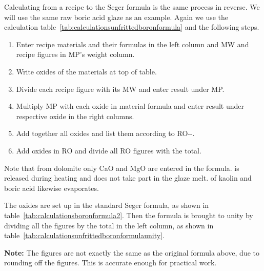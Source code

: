 Calculating from a recipe to the Seger formula is the same process in reverse. 
We will use the same raw boric acid glaze as an example. Again we use the 
calculation table~\ref{tab:calculationsunfrittedboronformula} and the following 
steps.
\begin{enumerate}
\item Enter recipe materials and their formulas in the left column and MW and 
recipe figures in MP's weight column.
\item Write oxides of the materials at top of table.
\item Divide each recipe figure with its MW and enter result under MP.
\item Multiply MP with each oxide in material formula and enter result under 
respective oxide in the right columns.
\item Add together all oxides and list them according to RO--.
\item Add oxides in RO and divide all RO figures with the total.
\end{enumerate}
Note that from dolomite only CaO and MgO are entered in the formula.  
is released during heating and does not take part in the glaze melt.  
of kaolin and boric acid likewise evaporates.

The oxides are set up in the standard Seger formula, as shown in 
table~\ref{tab:calculationsboronformula2}. Then the formula is brought to unity 
by dividing all the figures by the total in the left column, as shown in 
table~\ref{tab:calculationsunfrittedboronformulaunity}.

\textbf{Note:} The figures are not exactly the same as the original 
formula above, due to rounding off the figures. This is accurate enough for 
practical work.

